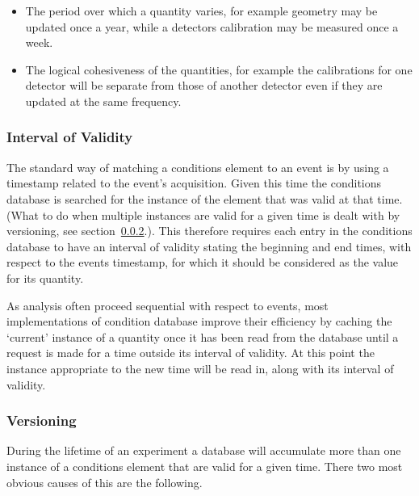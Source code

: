 \begin{itemize}
\item The period over which a quantity varies, for example geometry may be updated once a year, while a detectors calibration may be measured once a week.

\item The logical cohesiveness of the quantities, for example the calibrations for one detector will be separate from those of another detector even if they are updated at the same frequency.
\end{itemize}


\subsubsection{Interval of Validity}

The standard way of matching a conditions element to an event is by using a timestamp related to the event's acquisition. Given this time the conditions database is searched for the instance of the element that was valid at that time. (What to do when multiple instances are valid for a given time is dealt with by versioning, see section~\ref{conditions-versioning}.). This therefore requires each entry in the conditions database to have an interval of validity stating the beginning and end times, with respect to the events timestamp, for which it should be considered as the value for its quantity.

As analysis often proceed sequential with respect to events, most implementations of condition database improve their efficiency by caching the `current' instance of a quantity once it has been read from the database until a request is made for a time outside its interval of validity. At this point the instance appropriate to the new time will be read in, along with its interval of validity. 


\subsubsection{Versioning}
\label{conditions-versioning}

During the lifetime of an experiment a database will accumulate more than one instance of a conditions element that are valid for a given time. There two most obvious causes of this are the following.

